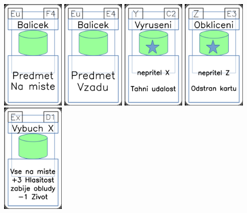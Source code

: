 \documentclass[a4paper]{article}
\begin{document}
	\includegraphics[width=3.0cm]{img-4_28}
	\includegraphics[width=3.0cm]{img-4_23}
	\includegraphics[width=3.0cm]{img-5_41}
	\includegraphics[width=3.0cm]{img-5_52}
	\includegraphics[width=3.0cm]{img-4_15}
\end{document}
